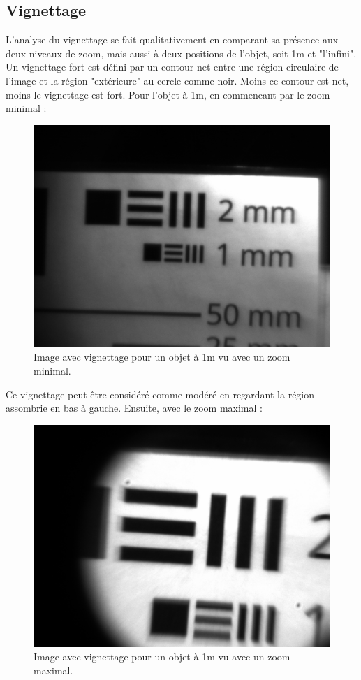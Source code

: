 \documentclass[11pt,letterpaper]{article}
\begin{document}
\subsection{Vignettage}

L'analyse du vignettage se fait qualitativement en comparant sa présence aux deux
niveaux de zoom, mais aussi à deux positions de l'objet, soit 1m et "l'infini". 
Un vignettage fort est défini par un contour net entre une région circulaire de 
l'image et la région "extérieure" au cercle comme noir. Moins ce contour est net, 
moins le vignettage est fort. Pour l'objet à 1m, en commencant par le zoom minimal : 

\begin{figure}[H]
  \centering
  \includegraphics[scale=0.3]{vig_1m_min.png}
  \caption{Image avec vignettage pour un objet à 1m vu avec un zoom minimal.}
  \label{vig_m_min}
\end{figure}

Ce vignettage peut être considéré comme modéré en regardant la région assombrie en 
bas à gauche. Ensuite, avec le zoom maximal :

\begin{figure}[H]
  \centering
  \includegraphics[scale=0.3]{vig_1m_max.png}
  \caption{Image avec vignettage pour un objet à 1m vu avec un zoom maximal.}
  \label{vig_m_max}
\end{figure}
\end{document}
